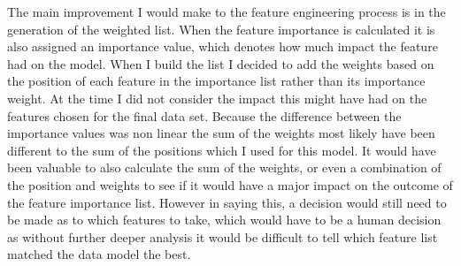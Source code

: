 \documentclass{imc-inf}
\begin{document}
	The main improvement I would make to the feature engineering process is in the generation of the weighted list. When the feature importance is calculated it is also assigned an importance value, which denotes how much impact the feature had on the model. When I build the list I decided to add the weights based on the position of each feature in the importance list rather than its importance weight. At the time I did not consider the impact this might have had on the features chosen for the final data set. Because the difference between the importance values was non linear the sum of the weights most likely have been different to the sum of the positions which I used for this model. It would have been valuable to also calculate the sum of the weights, or even a combination of the position and weights to see if it would have a major impact on the outcome of the feature importance list. However in saying this, a decision would still need to be made as to which features to take, which would have to be a human decision as without further deeper analysis it would be difficult to tell which feature list matched the data model the best.
	
\end{document}
